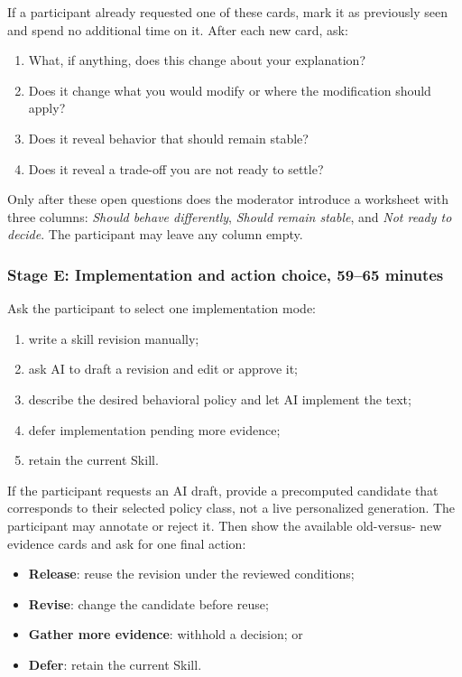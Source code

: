 If a participant already requested one of these cards, mark it as previously
seen and spend no additional time on it. After each new card, ask:

\begin{enumerate}[leftmargin=*]
    \item What, if anything, does this change about your explanation?
    \item Does it change what you would modify or where the modification should
    apply?
    \item Does it reveal behavior that should remain stable?
    \item Does it reveal a trade-off you are not ready to settle?
\end{enumerate}

Only after these open questions does the moderator introduce a worksheet with
three columns: \emph{Should behave differently}, \emph{Should remain stable},
and \emph{Not ready to decide}. The participant may leave any column empty.

\subsubsection{Stage E: Implementation and action choice, 59--65 minutes}

Ask the participant to select one implementation mode:

\begin{enumerate}[leftmargin=*]
    \item write a skill revision manually;
    \item ask AI to draft a revision and edit or approve it;
    \item describe the desired behavioral policy and let AI implement the text;
    \item defer implementation pending more evidence;
    \item retain the current Skill.
\end{enumerate}

If the participant requests an AI draft, provide a precomputed candidate that
corresponds to their selected policy class, not a live personalized generation.
The participant may annotate or reject it. Then show the available old-versus-
new evidence cards and ask for one final action:

\begin{itemize}[leftmargin=*]
    \item \textbf{Release}: reuse the revision under the reviewed conditions;
    \item \textbf{Revise}: change the candidate before reuse;
    \item \textbf{Gather more evidence}: withhold a decision; or
    \item \textbf{Defer}: retain the current Skill.
\end{itemize}

